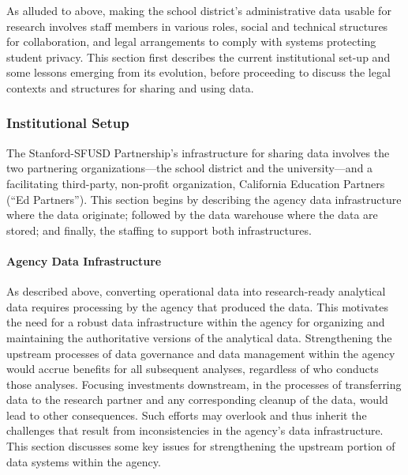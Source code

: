 \documentclass[
]{WileySix}
\begin{document}
As alluded to above, making the school district's administrative data usable for research involves staff members in various roles, social and technical structures for collaboration, and legal arrangements to comply with systems protecting student privacy. This section first describes the current institutional set-up and some lessons emerging from its evolution, before proceeding to discuss the legal contexts and structures for sharing and using data.

\hypertarget{institutional-setup-5}{%
\subsubsection{Institutional Setup}\label{institutional-setup-5}}

The Stanford-SFUSD Partnership's infrastructure for sharing data involves the two partnering organizations---the school district and the university---and a facilitating third-party, non-profit organization, California Education Partners (``Ed Partners''). This section begins by describing the agency data infrastructure where the data originate; followed by the data warehouse where the data are stored; and finally, the staffing to support both infrastructures.

\hypertarget{agency-data-infrastructure}{%
\paragraph{Agency Data Infrastructure}\label{agency-data-infrastructure}}

As described above, converting operational data into research-ready analytical data requires processing by the agency that produced the data. This motivates the need for a robust data infrastructure within the agency for organizing and maintaining the authoritative versions of the analytical data. Strengthening the upstream processes of data governance and data management within the agency would accrue benefits for all subsequent analyses, regardless of who conducts those analyses. Focusing investments downstream, in the processes of transferring data to the research partner and any corresponding cleanup of the data, would lead to other consequences. Such efforts may overlook and thus inherit the challenges that result from inconsistencies in the agency's data infrastructure. This section discusses some key issues for strengthening the upstream portion of data systems within the agency.
\end{document}
